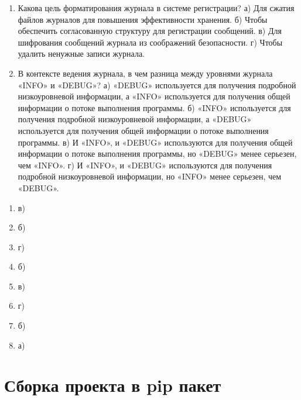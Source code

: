 \documentclass[letterpaper,10pt,russian]{sphinxmanual}
\begin{document}
\begin{enumerate}
\item {} 
\sphinxAtStartPar
Какова цель форматирования журнала в системе регистрации?
а) Для сжатия файлов журналов для повышения эффективности хранения.
б) Чтобы обеспечить согласованную структуру для регистрации сообщений.
в) Для шифрования сообщений журнала из соображений безопасности.
г) Чтобы удалить ненужные записи журнала.

\item {} 
\sphinxAtStartPar
В контексте ведения журнала, в чем разница между уровнями журнала «INFO» и «DEBUG»?
а) «DEBUG» используется для получения подробной низкоуровневой информации, а «INFO» используется для получения общей информации о потоке выполнения программы.
б) «INFO» используется для получения подробной низкоуровневой информации, а «DEBUG» используется для получения общей информации о потоке выполнения программы.
в) И «INFO», и «DEBUG» используются для получения общей информации о потоке выполнения программы, но «DEBUG» менее серьезен, чем «INFO».
г) И «INFO», и «DEBUG» используются для получения подробной низкоуровневой информации, но «INFO» менее серьезен, чем «DEBUG».

\end{enumerate}

\sphinxAtStartPar
{}
\begin{enumerate}
%
\item {} 
\sphinxAtStartPar
в)

\item {} 
\sphinxAtStartPar
б)

\item {} 
\sphinxAtStartPar
г)

\item {} 
\sphinxAtStartPar
б)

\item {} 
\sphinxAtStartPar
в)

\item {} 
\sphinxAtStartPar
г)

\item {} 
\sphinxAtStartPar
б)

\item {} 
\sphinxAtStartPar
а)

\end{enumerate}


\chapter{Сборка проекта в pip пакет}
\label{\detokenize{index:pip}}
\sphinxstepscope
\end{document}
